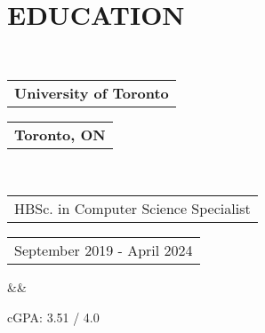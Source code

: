 \documentclass[12pt,letterpaper,roman]{moderncv}
\makeatletter
\def \scaleFont {1.09} %
\def \headingSpace {-9mm * \real{\scaleFont}} %
\def \scaleHeadings {1.15}
\newcommand*{\customcventry}[7][.25em]{
  \begin{tabular}{@{}l}
    {\relscale{\scaleHeadings}\bfseries #4}
  \end{tabular}
  \hfill%
  \begin{tabular}{l@{}}
     {\bfseries #5}
  \end{tabular} \\
  \begin{tabular}{@{}l}
    {#3}
  \end{tabular}
  \hfill%
  \begin{tabular}{l@{}}
     {#2}
  \end{tabular}
  \ifx&#7&
  \else{\\
    \begin{minipage}{\maincolumnwidth}
      \small#7
    \end{minipage}}\fi
  \par\addvspace{#1}}
\newcommand*{\customcvproject}[4][.25em]{
  \begin{tabular}{@{}l}
    {\relscale{\scaleHeadings}\bfseries #2}
  \end{tabular}
  \hfill%
  \begin{tabular}{l@{}}
     {\textcolor{blue}{#3}}
  \end{tabular}\\[-5.5mm]
  \ifx&#4&
  \else{\\
    \begin{minipage}{\maincolumnwidth}
      \small#4
    \end{minipage}}\fi
  \par\addvspace{#1}\leavevmode \\[0mm]}
\makeatother
\begin{document}
\leavevmode\\[-20mm]

\section{EDUCATION} \leavevmode \\[\headingSpace]
{\customcventry{September 2019 - April 2024}{HBSc. in Computer Science Specialist}{University of Toronto}{Toronto, ON}{}{}}
\vspace*{-1.5mm}
cGPA: 3.51 / 4.0
\end{document}

